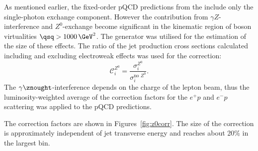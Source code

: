 As mentioned earlier, the fixed-order pQCD predictions from the \nlojet include only the single-photon exchange component. However the contribution from $\gamma Z$-interference and $Z^0$-exchange become significant in the kinematic region of boson virtualities $\qsq > 1000\, \GeV^{2}$. The \lepto generator was utilised for the estimation of the size of these effects. The ratio of the jet production cross sections calculated including and excluding electroweak effects was used for the correction:
\begin{equation}
 \mathcal{C}^\text{$Z^0$}_i = \frac{\sigma_i^\text{$Z^0$}}{\sigma_i^\text{no $Z^0$}}.
 \label{eq:z0corr}
\end{equation}
The $\gamma\znought$-interference depends on the charge of the lepton beam, thus the luminosity-weighted average of the correction factors for the $e^+p$ and $e^-p$ scattering was applied to the pQCD predictions.

The correction factors are shown in Figures~\ref{fig:z0corr}. The size of the correction is approximately independent of jet transverse energy and reaches about 20\% in the largest \qsq bin.


